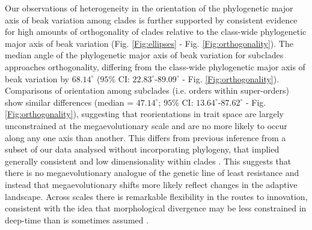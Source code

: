 \documentclass[12pt,letterpaper]{article}
\begin{document}
Our observations of heterogeneity in the orientation of the phylogenetic major axis of beak variation among clades is further supported by consistent evidence for high amounts of orthogonality of clades relative to the class-wide phylogenetic major axis of beak variation (Fig. \ref{Fig:ellipses} - Fig. \ref{Fig:orthogonality}).
The median angle of the phylogenetic major axis of beak variation for subclades approaches orthogonality, differing from the class-wide phylogenetic major axis of beak variation by $68.14^\circ$ ($95$\% CI: $22.83^\circ$-$89.09^\circ$ - Fig. \ref{Fig:orthogonality}).
Comparisons of orientation among subclades (i.e. orders within super-orders) show similar differences (median = $47.14^\circ$; $95$\% CI: $13.64^\circ$-$87.62^\circ$ - Fig. \ref{Fig:orthogonality}), suggesting that reorientations in trait space are largely unconstrained at the megaevolutionary scale and are no more likely to occur along any one axis than another.
This differs from previous inference from a subset of our data analysed  without incorporating phylogeny, that implied generally consistent and low dimensionality within clades \cite{cooney2017mega}.
This suggests that there is no megaevolutionary analogue of the genetic line of least resistance and instead that megaevolutionary shifts more likely reflect changes in the adaptive landscape.
Across scales there is remarkable flexibility in the routes to innovation, consistent with the idea that morphological divergence may be less constrained in deep-time than is sometimes assumed \cite{venditti2011multiple}. %
\end{document}
